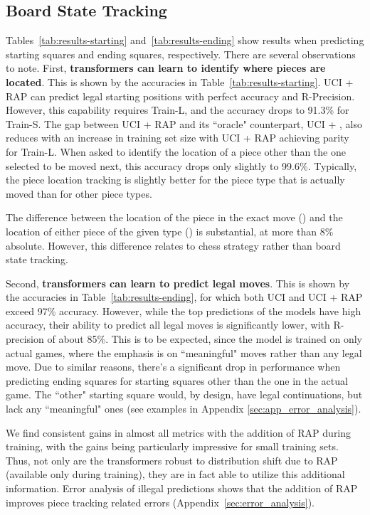 \subsection{Board State Tracking}
\label{sec:state_tracking_res}
Tables~\ref{tab:results-starting} and~\ref{tab:results-ending} show results when predicting starting squares and ending squares, respectively. 
There are several observations to note. First,  \textbf{transformers can learn to identify where pieces are located}.
This is shown by the \legalmove accuracies in Table~\ref{tab:results-starting}.
UCI + RAP can predict legal starting positions with perfect accuracy and R-Precision. 
However, this capability requires Train-L, and the accuracy drops to 91.3\% for Train-S. 
The gap between UCI + RAP and its ``oracle" counterpart, UCI + \piecetype, also reduces with an increase in training set size with UCI + RAP achieving parity for Train-L.
When asked to identify the location of a piece other than the one selected to be moved next, this accuracy drops only slightly to 99.6\%. 
Typically, the piece location tracking is slightly better for the piece type that is actually moved 
than for other piece types.

The difference between the location of the piece in the exact move (\exactmove) and the location of either piece of the given type (\legalmove) is substantial, at more than 8\% absolute.  
However, this difference relates to chess strategy rather than board state tracking. 





Second, \textbf{transformers can learn to predict legal moves}.
This is shown by the \legalmove accuracies in  Table~\ref{tab:results-ending}, for which both UCI and UCI + RAP exceed 97\% accuracy. 
However, while the top predictions of the models have high accuracy, their ability to predict all legal moves is significantly lower, with R-precision of about 85\%. 
This is to be expected, since the model is trained on only actual games, where the emphasis is on ``meaningful" moves rather than any legal move. 
Due to similar reasons, there's a significant drop in performance when predicting ending squares for starting squares other than the one in the actual game. 
	The ``other" starting square would, by design, have legal continuations, but lack any ``meaningful" ones 	(see examples in Appendix \ref{sec:app_error_analysis}).



We find consistent gains in almost all metrics with the addition of RAP during training, with the gains being particularly impressive for small training sets. Thus, not only are the transformers robust to distribution shift due to RAP (available only during training), they are in fact able to utilize this additional information. Error analysis of illegal predictions shows that the addition of RAP improves piece tracking related errors (Appendix~\ref{sec:error_analysis}).  


